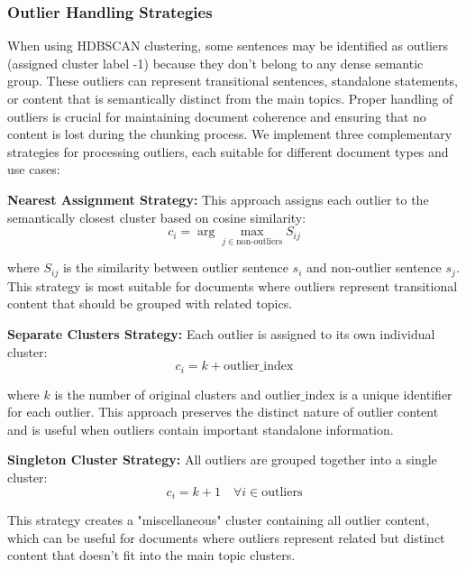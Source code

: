\documentclass[10pt,twocolumn,letterpaper]{article}
\begin{document}
\subsubsection{Outlier Handling Strategies}

When using HDBSCAN clustering, some sentences may be identified as outliers (assigned cluster label -1) because they don't belong to any dense semantic group. These outliers can represent transitional sentences, standalone statements, or content that is semantically distinct from the main topics. Proper handling of outliers is crucial for maintaining document coherence and ensuring that no content is lost during the chunking process. We implement three complementary strategies for processing outliers, each suitable for different document types and use cases:

\vspace{0.5em}
\textbf{Nearest Assignment Strategy:} This approach assigns each outlier to the semantically closest cluster based on cosine similarity:
\begin{equation}
c_i = \arg\max_{j \in \text{non-outliers}} S_{ij}
\end{equation}

where $S_{ij}$ is the similarity between outlier sentence $s_i$ and non-outlier sentence $s_j$. This strategy is most suitable for documents where outliers represent transitional content that should be grouped with related topics.

\vspace{0.5em}
\textbf{Separate Clusters Strategy:} Each outlier is assigned to its own individual cluster:
\begin{equation}
c_i = k + \text{outlier\_index}
\end{equation}

where $k$ is the number of original clusters and $\text{outlier\_index}$ is a unique identifier for each outlier. This approach preserves the distinct nature of outlier content and is useful when outliers contain important standalone information.

\vspace{0.5em}
\textbf{Singleton Cluster Strategy:} All outliers are grouped together into a single cluster:
\begin{equation}
c_i = k + 1 \quad \forall i \in \text{outliers}
\end{equation}

This strategy creates a "miscellaneous" cluster containing all outlier content, which can be useful for documents where outliers represent related but distinct content that doesn't fit into the main topic clusters.
\end{document}
